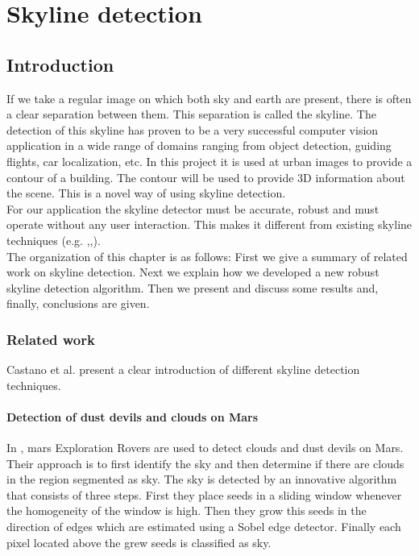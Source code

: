 
\section{Skyline detection}
\label{chap:skylinedetection}
 \subsection{Introduction}
If we take a regular image on which both sky and earth are present, there
is often a clear separation between them. This separation is called the
skyline. %
The detection of this skyline has proven to be a very successful computer vision
application in a wide range of domains ranging from object detection, 
guiding flights, car localization, etc. In this project it is used at urban
images to provide a contour of a building.  The contour will be used to
provide 3D information about the scene. This is a novel way of using skyline
detection.\\
For our application the skyline detector must be accurate, robust and must
operate without any user interaction. This makes it different from existing
skyline techniques (e.g. \cite{Dust},\cite{Guidedflight},\cite{Rover}).\\
The organization of this chapter is as follows:  First we give a summary of
related work on skyline detection.  Next we explain how we developed a new
robust skyline detection algorithm.  Then we present and discuss some results
and, finally, conclusions are given.

\subsubsection{Related work}
Castano et al. \cite{Dust} present a clear introduction of different skyline
detection techniques. 

\paragraph{Detection of dust devils and clouds on Mars}
In \cite{Dust}, mars Exploration Rovers are used to detect clouds and dust devils on Mars.
Their approach is to first identify the sky and then determine if there are
clouds in the region segmented as sky. The sky is detected by an innovative
algorithm that consists of three steps.  First they place seeds in a sliding
window whenever the homogeneity of the window is high. Then they grow this seeds
in the direction of edges which are estimated using a Sobel edge detector.
Finally each pixel located above the grew seeds is classified as sky.\\


